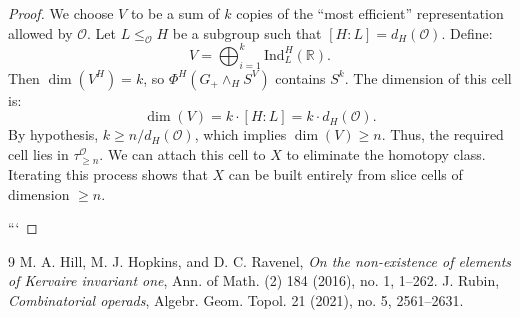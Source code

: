 \documentclass[11pt]{article}
\theoremstyle{plain}
\theoremstyle{definition}
\newcommand{\Ocal}{\mathcal{O}}
\newcommand{\Ind}{\mathrm{Ind}}
\newcommand{\R}{\mathbb{R}}
\newcommand{\slice}[1]{\tau_{\ge #1}^{\Ocal}}
\begin{document}
\begin{proof}
We choose $V$ to be a sum of $k$ copies of the ``most efficient'' representation allowed by $\Ocal$. Let $L \le_\Ocal H$ be a subgroup such that $[H:L] = d_H(\Ocal)$. Define:
\[
    V = \bigoplus_{i=1}^k \Ind_{L}^H(\R).
\]
Then $\dim(V^H) = k$, so $\Phi^H(G_+ \wedge_H S^V)$ contains $S^k$.
The dimension of this cell is:
\[
    \dim(V) = k \cdot [H:L] = k \cdot d_H(\Ocal).
\]
By hypothesis, $k \ge n / d_H(\Ocal)$, which implies $\dim(V) \ge n$.
Thus, the required cell lies in $\slice{n}$. We can attach this cell to $X$ to eliminate the homotopy class. Iterating this process shows that $X$ can be built entirely from slice cells of dimension $\ge n$.

```

\end{proof}

\begin{thebibliography}{9}
 M. A. Hill, M. J. Hopkins, and D. C. Ravenel, \textit{On the non-existence of elements of Kervaire invariant one}, Ann. of Math. (2) 184 (2016), no. 1, 1–262.
 J. Rubin, \textit{Combinatorial  operads}, Algebr. Geom. Topol. 21 (2021), no. 5, 2561–2631.
\end{thebibliography}
\end{document}
